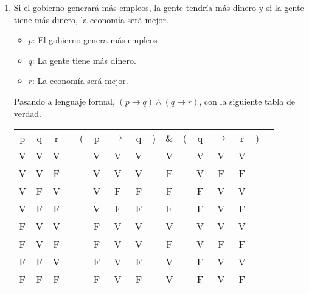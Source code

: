 \documentclass[a4paper,10pt]{article}
\begin{document}
\begin{enumerate}
\item Si el gobierno generará más empleos, la gente tendría más dinero y si la gente tiene más dinero, la economía será mejor.

\begin{itemize}
 \item \(p\): El gobierno genera más empleos
 \item \(q\): La gente tiene más dinero.
 \item \(r\): La economía será mejor.
\end{itemize}

Pasando a lenguaje formal, \((p \to q) \land (q \to r) \), con la siguiente tabla de verdad.
\begin{center}
\begin{tabular}{@{ }c@{ }@{ }c@{ }@{ }c c@{ }@{}c@{}@{ }c@{ }@{ }c@{ }@{ }c@{ }@{}c@{}@{ }c@{ }@{}c@{}@{ }c@{ }@{ }c@{ }@{ }c@{ }@{}c@{}@{ }c}
p & q & r &  & ( & p & $\rightarrow$ & q & ) & $\&$ & ( & q & $\rightarrow$ & r & ) & \\
V & V & V &  &  & V & V & V &  & V &  & V & V & V &  & \\
V & V & F &  &  & V & V & V &  & F &  & V & F & F &  & \\
V & F & V &  &  & V & F & F &  & F &  & F & V & V &  & \\
V & F & F &  &  & V & F & F &  & F &  & F & V & F &  & \\
F & V & V &  &  & F & V & V &  & V &  & V & V & V &  & \\
F & V & F &  &  & F & V & V &  & F &  & V & F & F &  & \\
F & F & V &  &  & F & V & F &  & V &  & F & V & V &  & \\
F & F & F &  &  & F & V & F &  & V &  & F & V & F &  & \\
\end{tabular}
\end{center}

\end{enumerate}
\end{document}

